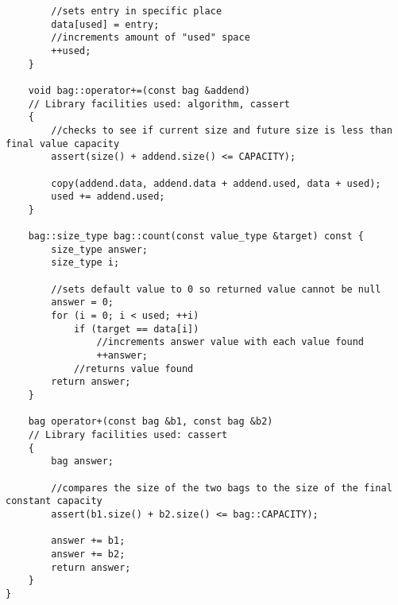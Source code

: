 \documentclass[11pt]{article}
\begin{document}
\begin{lstlisting}
        //sets entry in specific place
        data[used] = entry;
        //increments amount of "used" space
        ++used;
    }

    void bag::operator+=(const bag &addend)
    // Library facilities used: algorithm, cassert
    {
        //checks to see if current size and future size is less than final value capacity
        assert(size() + addend.size() <= CAPACITY);

        copy(addend.data, addend.data + addend.used, data + used);
        used += addend.used;
    }

    bag::size_type bag::count(const value_type &target) const {
        size_type answer;
        size_type i;

        //sets default value to 0 so returned value cannot be null
        answer = 0;
        for (i = 0; i < used; ++i)
            if (target == data[i])
                //increments answer value with each value found
                ++answer;
            //returns value found
        return answer;
    }

    bag operator+(const bag &b1, const bag &b2)
    // Library facilities used: cassert
    {
        bag answer;

        //compares the size of the two bags to the size of the final constant capacity
        assert(b1.size() + b2.size() <= bag::CAPACITY);

        answer += b1;
        answer += b2;
        return answer;
    }
}

\end{lstlisting}
\end{document}
